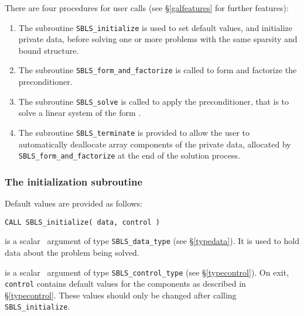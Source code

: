 \documentclass{galahad}
\newcommand{\packagename}{SBLS}
\begin{document}

\galarguments
There are four procedures for user calls
(see \S\ref{galfeatures} for further features): 

\begin{enumerate}
\item The subroutine 
      {\tt \packagename\_initialize} 
      is used to set default values, and initialize private data, 
      before solving one or more problems with the
      same sparsity and bound structure.
\item The subroutine 
      {\tt \packagename\_form\_and\_factorize} 
      is called to form and factorize the preconditioner.
\item The subroutine 
      {\tt \packagename\_solve} 
      is called to apply the preconditioner, that is to solve a linear 
      system of the form .
\item The subroutine 
      {\tt \packagename\_terminate} 
      is provided to allow the user to automatically deallocate array 
       components of the private data, allocated by 
       {\tt \packagename\_form\_and\_factorize} 
       at the end of the solution process. 
\end{enumerate}


\subsubsection{The initialization subroutine}\label{subinit}
 Default values are provided as follows:
\vspace*{1mm}

\hspace{8mm}
{\tt CALL \packagename\_initialize( data, control )}

\vspace*{-3mm}
\begin{description}

 is a scalar \intentinout\ argument of type 
{\tt \packagename\_data\_type}
(see \S\ref{typedata}). It is used to hold data about the problem being 
solved. 

 is a scalar \intentout\ argument of type 
{\tt \packagename\_control\_type}
(see \S\ref{typecontrol}). 
On exit, {\tt control} contains default values for the components as
described in \S\ref{typecontrol}.
These values should only be changed after calling 
{\tt \packagename\_initialize}.

\end{description}
\end{document}
